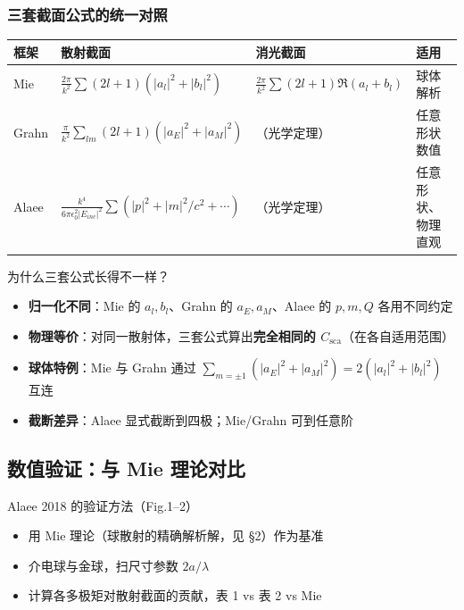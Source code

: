\subsubsection{三套截面公式的统一对照}

\begin{center}
\begin{tabular}{p{2.6cm}p{3.6cm}p{3.6cm}p{3.6cm}}
\toprule
\textbf{框架} & \textbf{散射截面} & \textbf{消光截面} & \textbf{适用} \\
\midrule
Mie & $\frac{2\pi}{k^2}\sum(2l+1)(|a_l|^2+|b_l|^2)$ & $\frac{2\pi}{k^2}\sum(2l+1)\Re(a_l+b_l)$ & 球体解析 \\
Grahn & $\frac{\pi}{k^2}\sum_{lm}(2l+1)(|a_E|^2+|a_M|^2)$ & （光学定理） & 任意形状数值 \\
Alaee & $\frac{k^4}{6\pi\epsilon_0^2|E_{inc}|^2}\sum(|p|^2+|m|^2/c^2+\cdots)$ & （光学定理） & 任意形状、物理直观 \\
\bottomrule
\end{tabular}
\end{center}

\begin{stepbox}{为什么三套公式长得不一样？}
\begin{itemize}
  \item \textbf{归一化不同}：Mie 的 $a_l,b_l$、Grahn 的 $a_E,a_M$、Alaee 的 $p,m,Q$ 各用不同约定
  \item \textbf{物理等价}：对同一散射体，三套公式算出\textbf{完全相同的 $C_{\text{sca}}$}（在各自适用范围）
  \item \textbf{球体特例}：Mie 与 Grahn 通过 $\sum_{m=\pm1}(|a_E|^2+|a_M|^2)=2(|a_l|^2+|b_l|^2)$ 互连
  \item \textbf{截断差异}：Alaee 显式截断到四极；Mie/Grahn 可到任意阶
\end{itemize}
\end{stepbox}

\subsection{数值验证：与 Mie 理论对比}

\begin{stepbox}{Alaee 2018 的验证方法（Fig.1--2）}
\begin{itemize}
  \item 用 Mie 理论（球散射的精确解析解，见 \S2）作为基准
  \item 介电球与金球，扫尺寸参数 $2a/\lambda$
  \item 计算各多极矩对散射截面的贡献，表 1 vs 表 2 vs Mie
\end{itemize}
\end{stepbox}

